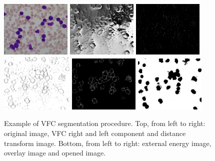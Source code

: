 \documentclass[final,a4paper,12pt,english]{UnicaPhdThesis3}
\begin{document}
\begin{figure}[!t]
	\centering
	\includegraphics[height=0.2\textwidth, width=0.3\textwidth]{images/2018_1_visapp/015_1}
	\includegraphics[height=0.2\textwidth, width=0.3\textwidth]{images/2018_1_visapp/figure2}
	\includegraphics[height=0.2\textwidth, width=0.3\textwidth]{images/2018_1_visapp/figure3}
	\includegraphics[height=0.2\textwidth, width=0.31\textwidth]{images/2018_1_visapp/figure4}
	\includegraphics[height=0.2\textwidth, width=0.3\textwidth]{images/2018_1_visapp/figure5}
	\includegraphics[height=0.2\textwidth, width=0.3\textwidth]{images/2018_1_visapp/figure7}
	\caption{\label{fig:vfc1}Example of VFC segmentation procedure. Top, from left to right: original image, VFC right and left component and distance transform image. Bottom, from left to right: external energy image, overlay image and opened image.}
\end{figure}
\end{document}
